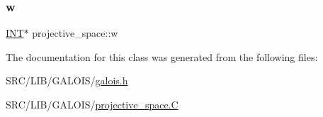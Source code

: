 \mbox{\label{classprojective__space_af2cc6c48f25e83b456bc0a3fbbfcfb6c}} 
\subsubsection{\texorpdfstring{w}{w}}
{\footnotesize\ttfamily \mbox{\hyperlink{galois_8h_a09fddde158a3a20bd2dcadb609de11dc}{I\+NT}}$\ast$ projective\+\_\+space\+::w}



The documentation for this class was generated from the following files\+:\begin{DoxyCompactItemize}
\item 
S\+R\+C/\+L\+I\+B/\+G\+A\+L\+O\+I\+S/\mbox{\hyperlink{galois_8h}{galois.\+h}}\item 
S\+R\+C/\+L\+I\+B/\+G\+A\+L\+O\+I\+S/\mbox{\hyperlink{_g_a_l_o_i_s_2projective__space_8_c}{projective\+\_\+space.\+C}}\end{DoxyCompactItemize}
